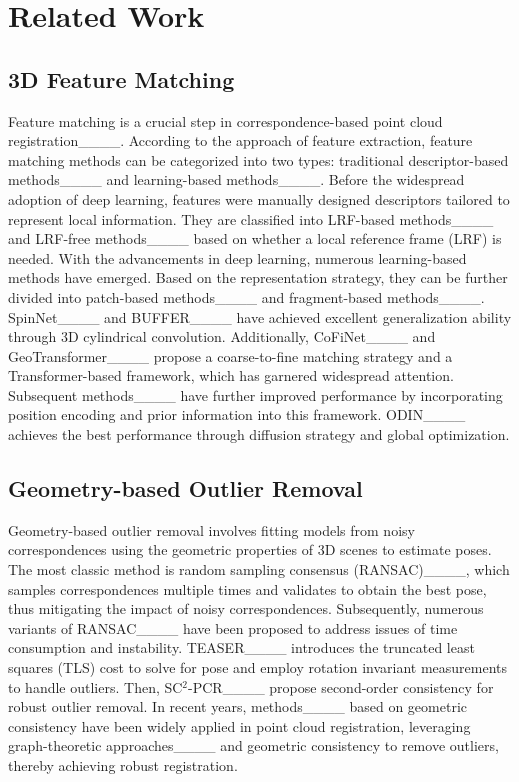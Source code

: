 \section{Related Work}
\subsection{3D Feature Matching}
Feature matching is a crucial step in 
correspondence-based point cloud registration____. 
According to the approach of feature extraction, feature matching methods 
can be categorized into two types: traditional descriptor-based methods____ and 
learning-based methods____. 
Before the widespread adoption of deep learning, features were manually designed descriptors tailored to represent local information. 
They are classified into LRF-based methods____ and LRF-free methods____ 
based on whether a local reference frame (LRF) is needed. With the advancements in deep learning, 
numerous learning-based methods have emerged. Based on the representation strategy, 
they can be further divided into patch-based methods____ 
and fragment-based methods____. 
SpinNet____ and BUFFER____ have achieved excellent generalization ability through 3D cylindrical convolution. Additionally, CoFiNet____ and GeoTransformer____ propose a coarse-to-fine matching strategy and a Transformer-based framework, which has garnered widespread attention. Subsequent methods____ have further 
improved performance by incorporating position encoding and prior information into this framework.
ODIN____ achieves the best performance through diffusion strategy and global optimization.

\subsection{Geometry-based Outlier Removal}
Geometry-based outlier removal involves fitting models from noisy correspondences using the geometric properties of 3D scenes to estimate poses. The most classic method is random sampling consensus (RANSAC)____, which 
samples correspondences multiple times and validates to 
obtain the best pose, thus mitigating the impact of noisy correspondences. Subsequently, numerous variants of RANSAC____ have been proposed to address issues 
of time consumption and instability. TEASER____ introduces the truncated least squares (TLS) cost to solve for pose and employ rotation invariant measurements to handle outliers. Then, SC$^2$-PCR____ propose second-order consistency for robust outlier removal. In recent years, methods____ based on 
geometric consistency have been widely applied in point cloud registration, leveraging graph-theoretic approaches____ and geometric consistency to 
remove outliers, thereby achieving robust registration.

